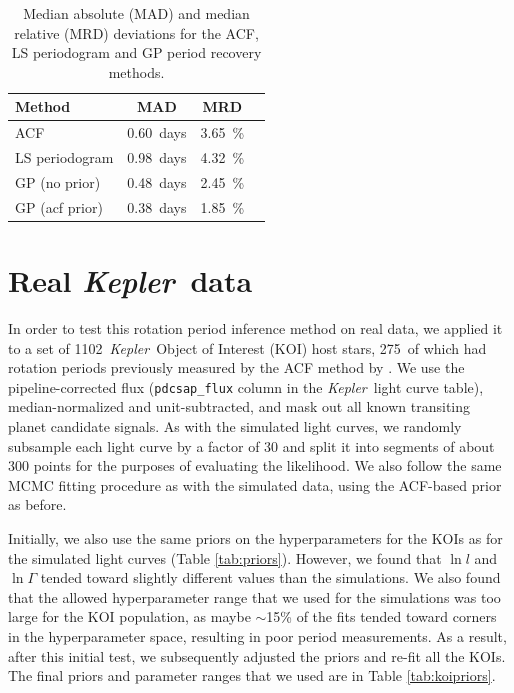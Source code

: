 \documentclass[useAMS, usenatbib, preprint, 12pt]{aastex}
\newcommand{\Kepler}{{\it Kepler}}
\newcommand{\kepler}{\Kepler}
\newcommand{\nkois}{1102}
\newcommand{\nkoimcq}{275}
\newcommand{\acfMAD}{0.60}
\newcommand{\percentacfMAD}{3.65}
\newcommand{\pgramMAD}{0.98}
\newcommand{\percentpgramMAD}{4.32}
\newcommand{\gpMADnp}{0.48}
\newcommand{\percentgpMADnp}{2.45}
\newcommand{\gpMAD}{0.38}
\newcommand{\percentgpMAD}{1.85}
\begin{document}
\begin{table}
\begin{center}
    \caption{Median absolute (MAD) and median relative (MRD) deviations for
    the ACF, LS periodogram and GP period recovery methods.}
\begin{tabular}{lccc}
Method & MAD & MRD \\
    \hline
    ACF & \acfMAD\ days & \percentacfMAD\ \% \\
    LS periodogram & \pgramMAD\ days & \percentpgramMAD\ \% \\
    GP (no prior) & \gpMADnp\ days & \percentgpMADnp\ \% \\
    GP (acf prior) & \gpMAD\ days & \percentgpMAD\ \% \\
\end{tabular}
\end{center}
\end{table}
\label{tab:MADs}

\section{Real \kepler\ data}
\label{sec:kepler}

In order to test this rotation period inference method on real data,
we applied it to a set of \nkois\ \Kepler\ Object of Interest (KOI)
host stars, \nkoimcq\ of which had rotation periods previously measured by
the ACF method by \citet{Mcquillan2013}.  We use the pipeline-corrected flux
(\texttt{pdcsap\_flux} column in the \Kepler\ light curve table), median-normalized
and unit-subtracted, and mask out all known transiting planet candidate signals.
As with the simulated light curves, we randomly subsample each
light curve by a factor of 30 and split it into segments of about 300 points
for the purposes of evaluating the likelihood.  We also follow the same MCMC
fitting procedure as with the simulated data, using the ACF-based prior as before.

Initially, we also use the same priors on the hyperparameters for the KOIs
as for the simulated light curves (Table \ref{tab:priors}).
However, we found that $\ln l$ and $\ln \Gamma$ tended toward slightly different
values than the simulations.  We also found that the allowed hyperparameter
range that we used for the simulations was too large for the KOI population,
as maybe $\sim$15\% of the fits tended toward corners in the hyperparameter
space, resulting in poor period measurements.  As a result, after this initial
test, we subsequently adjusted the priors and re-fit all the KOIs.  The final
priors and parameter ranges that we used are in Table \ref{tab:koipriors}.
\end{document}
